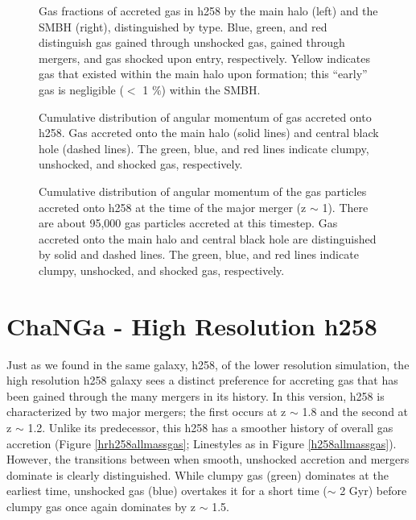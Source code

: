\documentclass[12pt,headA,chapB]{fiskthesis}
\begin{document}

\begin{figure}[h]
\centerline{}
\caption[GASOLINE h258 Galaxy and SMBH Gas Fractions at z=0]{Gas fractions of accreted gas in h258 by the main halo (left) and the SMBH (right), distinguished by type. Blue, green, and red distinguish gas gained through unshocked gas, gained through mergers, and gas shocked upon entry, respectively. Yellow indicates gas that existed within the main halo upon formation; this ``early'' gas is negligible ($<$ 1 $\%$) within the SMBH.}
\label{h258stackfrac} 
\end{figure}

\begin{figure}[p]
\centerline{}
\caption[GASOLINE h258 Cumulative Angular Momentum Distribution]{ Cumulative distribution of angular momentum of gas accreted onto h258.  Gas accreted onto the main halo (solid lines) and central black hole (dashed lines). The green, blue, and red lines indicate clumpy, unshocked, and shocked gas, respectively.}
\label{h258angmom} 

\centerline{}
\caption[GASOLINE h258 Merger Angular Momentum Distribution]{ Cumulative distribution of angular momentum of the gas particles accreted onto h258 at the time of the major merger (z $\sim$ 1). There are about 95,000 gas particles accreted at this timestep. Gas accreted onto the main halo and central black hole are distinguished by solid and dashed lines. The green, blue, and red lines indicate clumpy, unshocked, and shocked gas, respectively.}
\label{h258angmom_merger} 
\end{figure}


\section{ChaNGa - High Resolution h258}

Just as we found in the same galaxy, h258, of the lower resolution simulation, the high resolution h258 galaxy sees a distinct preference for accreting gas that has been gained through the many mergers in its history. In this version, h258 is characterized by two major mergers; the first occurs at z $\sim$ 1.8 and the second at z $\sim$ 1.2. Unlike its predecessor, this h258 has a smoother history of overall gas accretion (Figure \ref{hrh258allmassgas}; Linestyles as in Figure \ref{h258allmassgas}). However, the transitions between when smooth, unshocked accretion and mergers dominate is clearly distinguished. While clumpy gas (green) dominates at the earliest time, unshocked gas (blue) overtakes it for a short time ($\sim$ 2 Gyr) before clumpy gas once again dominates by z $\sim$ 1.5. 
\end{document}
